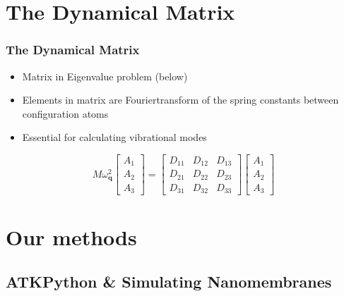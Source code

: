 \documentclass[hyperref={colorlinks=true,urlcolor=blue,linkcolor=.},aspectratio=1610,mathserif]{beamer}
\begin{document}
\section{The Dynamical Matrix}

\begin{frame}
 \frametitle{The Dynamical Matrix}
 \begin{itemize}[<+->]
  \pause
  \item Matrix in Eigenvalue problem (below)
  \item Elements in matrix are Fouriertransform of the spring constants between configuration atoms
  \item Essential for calculating vibrational modes
 \end{itemize}
 \begin{equation}
  M\omega_{\mathbf{q}}^{2}
  \begin{bmatrix}
   A_{1} \\
   A_{2} \\
   A_{3}
  \end{bmatrix}
  =
  \begin{bmatrix}
   D_{11} & D_{12} & D_{13} \\
   D_{21} & D_{22} & D_{23} \\
   D_{31} & D_{32} & D_{33}
  \end{bmatrix}\begin{bmatrix}
   A_{1} \\
   A_{2} \\
   A_{3}
  \end{bmatrix} \nonumber
 \end{equation}
\end{frame}

\section{Our methods}

\subsection{ATKPython \& Simulating Nanomembranes}
\end{document}
